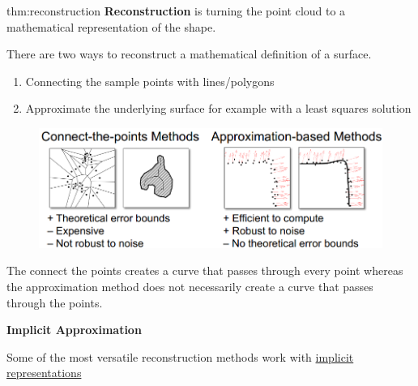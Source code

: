 \documentclass{article}
\begin{document}
\begin{defin}[Reconstruction]{thm:reconstruction}
    \textbf{Reconstruction} is turning the point cloud to a mathematical representation of the shape.
\end{defin}

\vspace{5px}

There are two ways to reconstruct a mathematical definition of a surface.

\begin{enumerate}
    \item Connecting the sample points with lines/polygons
    \item Approximate the underlying surface for example with a least squares solution
\end{enumerate}

\begin{figure}[!ht]
    \centering
    \includegraphics[width=0.5\linewidth]{images/reconstruction_two_methods.png}
\end{figure}

The connect the points creates a curve that passes through every point whereas the approximation method does not
necessarily create a curve that passes through the points.


\vspace{10px}

\textbf{Implicit Approximation}

Some of the most versatile reconstruction methods work with \hyperref[implicit-curves/surfaces]{implicit representations}
\end{document}
